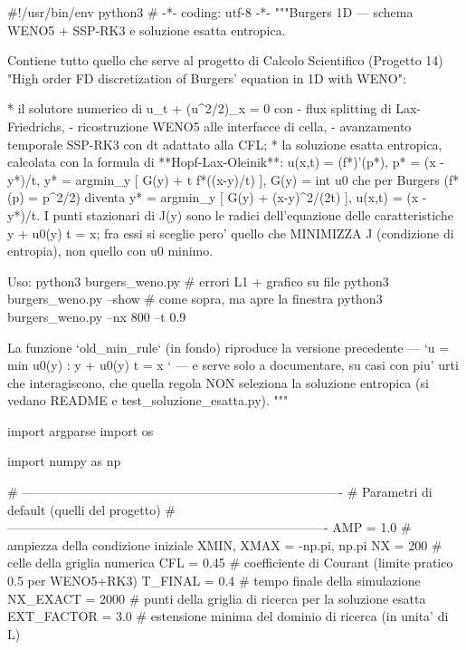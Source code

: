 \documentclass[12pt]{article}
\begin{document}
\newpage
\begin{pythoncode}[title=Implementazione WENO]

#!/usr/bin/env python3
# -*- coding: utf-8 -*-
"""Burgers 1D — schema WENO5 + SSP-RK3 e soluzione esatta entropica.

Contiene tutto quello che serve al progetto di Calcolo Scientifico
(Progetto 14) "High order FD discretization of Burgers' equation in 1D with
WENO":

  * il solutore numerico di  u_t + (u^2/2)_x = 0  con
      - flux splitting di Lax-Friedrichs,
      - ricostruzione WENO5 alle interfacce di cella,
      - avanzamento temporale SSP-RK3 con dt adattato alla CFL;
  * la soluzione esatta entropica, calcolata con la formula di
    **Hopf-Lax-Oleinik**:
        u(x,t) = (f*)'(p*),   p* = (x - y*)/t,
        y* = argmin_y [ G(y) + t f*((x-y)/t) ],   G(y) = int u0
    che per Burgers (f*(p) = p^2/2) diventa
        y* = argmin_y [ G(y) + (x-y)^2/(2t) ],    u(x,t) = (x - y*)/t.
    I punti stazionari di J(y) sono le radici dell'equazione delle
    caratteristiche y + u0(y) t = x; fra essi si sceglie pero' quello che
    MINIMIZZA J (condizione di entropia), non quello con u0 minimo.

Uso:
    python3 burgers_weno.py                 # errori L1 + grafico su file
    python3 burgers_weno.py --show          # come sopra, ma apre la finestra
    python3 burgers_weno.py --nx 800 --t 0.9

La funzione `old_min_rule` (in fondo) riproduce la versione precedente —
`u = min{ u0(y) : y + u0(y) t = x }` — e serve solo a documentare, su casi con
piu' urti che interagiscono, che quella regola NON seleziona la soluzione
entropica (si vedano README e test_soluzione_esatta.py).
"""

import argparse
import os

import numpy as np

# ----------------------------------------------------------------------------
# Parametri di default (quelli del progetto)
# ----------------------------------------------------------------------------
AMP = 1.0          # ampiezza della condizione iniziale
XMIN, XMAX = -np.pi, np.pi
NX = 200           # celle della griglia numerica
CFL = 0.45         # coefficiente di Courant (limite pratico 0.5 per WENO5+RK3)
T_FINAL = 0.4      # tempo finale della simulazione
NX_EXACT = 2000    # punti della griglia di ricerca per la soluzione esatta
EXT_FACTOR = 3.0   # estensione minima del dominio di ricerca (in unita' di L)


\end{pythoncode}
\end{document}
